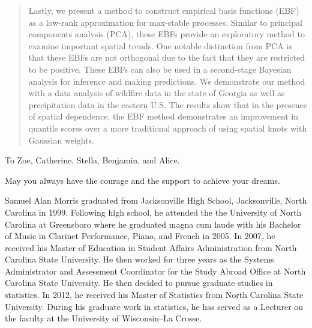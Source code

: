 \begin{abstract}
Lastly, we present a method to construct empirical basis functions (EBF) as a low-rank approximation for max-stable processes.
Similar to principal components analysis (PCA), these EBFs provide an exploratory method to examine important spatial trends.
One notable distinction from PCA is that these EBFs are not orthogonal due to the fact that they are restricted to be positive.
These EBFs can also be used in a second-stage Bayesian analysis for inference and making predictions.
We demonstrate our method with a data analysis of wildfire data in the state of Georgia as well as precipitation data in the eastern U.S.
The results show that in the presence of spatial dependence, the EBF method demonstrates an improvement in quantile scores over a more traditional approach of using spatial knots with Gaussian weights.

\end{abstract}


\makecopyrightpage

\maketitlepage

\begin{dedication}
 \centering To Zoe, Catherine, Stella, Benjamin, and Alice. 
 
 May you always have the courage and the support to achieve your dreams.
\end{dedication}

\begin{biography}
Samuel Alan Morris graduated from Jacksonville High School, Jacksonville, North Carolina in 1999.
Following high school, he attended the the University of North Carolina at Greensboro where he graduated magna cum laude with his Bachelor of Music in Clarinet Performance, Piano, and French in 2005.
In 2007, he received his Master of Education in Student Affairs Administration from North Carolina State University.
He then worked for three years as the Systems Administrator and Assessment Coordinator for the Study Abroad Office at North Carolina State University.
He then decided to pursue graduate studies in statistics.
In 2012, he received his Master of Statistics from North Carolina State University.
During his graduate work in statistics, he has served as a Lecturer on the faculty at the University of Wisconsin--La Crosse. 
\end{biography}

